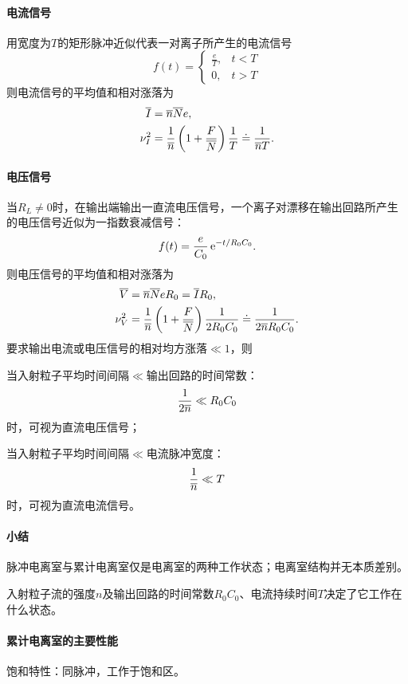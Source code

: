 \paragraph{电流信号}用宽度为$T$的矩形脉冲近似代表一对离子所产生的电流信号
\[
	f(t)=\begin{cases}
		\frac eT,&t<T\\
		0,&t>T
	\end{cases}
\]
则电流信号的平均值和相对涨落为
\begin{align}
	\overline I&=\overline n\overline Ne,\\
	\nu_I^2&=\frac1{\overline n}\left(1+\frac F{\overline N}\right)\frac1T\doteq\frac1{\overline nT}.
\end{align}
\paragraph{电压信号}
当$R_L\neq 0$时，在输出端输出一直流电压信号，一个离子对漂移在输出回路所产生的电压信号近似为一指数衰减信号：
\[
	f(t)=\frac e{C_0}\mathop{}\!\mathrm{e}^{-t/R_0C_0}.
\]
则电压信号的平均值和相对涨落为
\begin{align}
	\overline V&=\overline n\overline NeR_0=\overline IR_0,\\
	\nu_V^2&=\frac1{\overline n}\left(1+\frac F{\overline N}\right)\frac1{2R_0C_0}\doteq\frac1{2\overline nR_0C_0}.
\end{align}
要求输出电流或电压信号的相对均方涨落$\ll 1$，则
\begin{compactenum}
	\item 
	当入射粒子平均时间间隔$\ll$输出回路的时间常数：
	\[
		\frac1{2\overline n}\ll R_0C_0
	\]
	时，可视为直流电压信号；
	\item 
	当入射粒子平均时间间隔$\ll$电流脉冲宽度：
	\[
		\frac1{\overline n}\ll T
	\]
	时，可视为直流电流信号。
\end{compactenum}
\paragraph{小结}
\begin{compactenum}
	\item 脉冲电离室与累计电离室仅是电离室的两种工作状态；电离室结构并无本质差别。
	\item 入射粒子流的强度$n$及输出回路的时间常数$R_0C_0$、电流持续时间$T$决定了它工作在什么状态。
\end{compactenum}
\paragraph{累计电离室的主要性能}
饱和特性：同脉冲，工作于饱和区。

